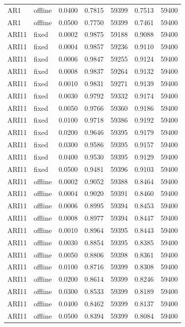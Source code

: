 \documentclass{article}
\begin{document}
\begin{longtable}[htbp]{l|l|l|*{4}{c}}
  AR1 & offline & 0.0400 & 0.7815 & 59399 & 0.7513 & 59400\\
  AR1 & offline & 0.0500 & 0.7750 & 59399 & 0.7461 & 59400\\
  ARI11 & fixed & 0.0002 & 0.9875 & 59188 & 0.9088 & 59400\\
  ARI11 & fixed & 0.0004 & 0.9857 & 59236 & 0.9110 & 59400\\
  ARI11 & fixed & 0.0006 & 0.9847 & 59255 & 0.9124 & 59400\\
  ARI11 & fixed & 0.0008 & 0.9837 & 59264 & 0.9132 & 59400\\
  ARI11 & fixed & 0.0010 & 0.9831 & 59271 & 0.9139 & 59400\\
  ARI11 & fixed & 0.0030 & 0.9792 & 59332 & 0.9174 & 59400\\
  ARI11 & fixed & 0.0050 & 0.9766 & 59360 & 0.9186 & 59400\\
  ARI11 & fixed & 0.0100 & 0.9718 & 59386 & 0.9192 & 59400\\
  ARI11 & fixed & 0.0200 & 0.9646 & 59395 & 0.9179 & 59400\\
  ARI11 & fixed & 0.0300 & 0.9586 & 59395 & 0.9157 & 59400\\
  ARI11 & fixed & 0.0400 & 0.9530 & 59395 & 0.9129 & 59400\\
  ARI11 & fixed & 0.0500 & 0.9481 & 59396 & 0.9103 & 59400\\
  ARI11 & offline & 0.0002 & 0.9052 & 59388 & 0.8464 & 59400\\
  ARI11 & offline & 0.0004 & 0.9020 & 59391 & 0.8460 & 59400\\
  ARI11 & offline & 0.0006 & 0.8995 & 59394 & 0.8453 & 59400\\
  ARI11 & offline & 0.0008 & 0.8977 & 59394 & 0.8447 & 59400\\
  ARI11 & offline & 0.0010 & 0.8964 & 59395 & 0.8443 & 59400\\
  ARI11 & offline & 0.0030 & 0.8854 & 59395 & 0.8385 & 59400\\
  ARI11 & offline & 0.0050 & 0.8806 & 59398 & 0.8361 & 59400\\
  ARI11 & offline & 0.0100 & 0.8716 & 59399 & 0.8308 & 59400\\
  ARI11 & offline & 0.0200 & 0.8614 & 59399 & 0.8246 & 59400\\
  ARI11 & offline & 0.0300 & 0.8533 & 59399 & 0.8189 & 59400\\
  ARI11 & offline & 0.0400 & 0.8462 & 59399 & 0.8137 & 59400\\
  ARI11 & offline & 0.0500 & 0.8394 & 59399 & 0.8084 & 59400\\
\end{longtable}
\end{document}
